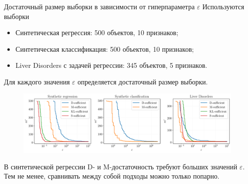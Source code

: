 \documentclass{beamer}
\begin{document}
\begin{frame}{Достаточный размер выборки в зависимости от гиперпараметра $\varepsilon$}
    Используются выборки
    \begin{itemize}
        \item Синтетическая регрессия: 500 объектов, 10 признаков;
        \item Синтетическая классификация: 500 объектов, 10 признаков;
        \item Liver Disorders с задачей регрессии: 345 объектов, 5 признаков. 
    \end{itemize}
    Для каждого значения $\varepsilon$ определяется достаточный размер выборки.
    \begin{figure}
        \includegraphics[width=\textwidth]{sufficient-vs-threshold}
    \end{figure}
    В синтетической регрессии D- и M-достаточность требуют больших значений $\varepsilon$. Тем не менее, сравнивать между собой подходы можно только попарно.
\end{frame}
\end{document}
